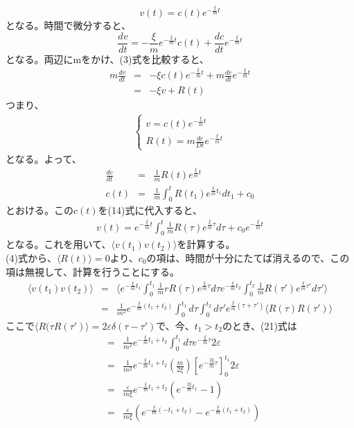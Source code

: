 \documentclass[10pt]{jreport}
\begin{document}
\begin{equation}
v(t) = c(t)e^{-\frac{\xi}{m}t}
\end{equation}
となる。時間で微分すると、
\begin{equation}
\frac{dv}{dt}=-\frac{\xi}{m}e^{-\frac{\xi}{m}t}c(t) + \frac{dc}{dt}e^{-\frac{\xi}{m}t}
\end{equation}
となる。両辺にmをかけ、(3)式を比較すると、
\begin{eqnarray}
m\frac{dv}{dt} &=& -\xi c(t)e^{-\frac{\xi}{m}t}+m\frac{dc}{dt}e^{-\frac{\xi}{m}t} \\
&=& -\xi v +R(t)
\end{eqnarray}
つまり、
\begin{eqnarray}
\left \{
\begin{array}{l}
v = c(t) e^{-\frac{\xi}{m}t} \\
R(t) =m\frac{dc}{Dt}e^{-\frac{\xi}{m}t}
\end{array}
\right.
\end{eqnarray}
となる。よって、
\begin{eqnarray}
\frac{dc}{dt} &=& \frac{1}{m}R(t)e^{\frac{\xi}{m}t} \nonumber \\
c(t) &=& \frac{1}{m}\int^t_0R(t_1)e^{\frac{\xi}{m}t_1}dt_1 +c_0
\end{eqnarray}
とおける。この$c(t)$を(14)式に代入すると、
\begin{eqnarray}
v(t) = e^{-\frac{\xi}{m}t}\int^t_0 \frac{1}{m}R(\tau)e^{\frac{\xi}{m}\tau}d\tau +c_0e^{-\frac{\xi}{m}t}
\end{eqnarray}
となる。これを用いて、$\langle v(t_1)v(t_2) \rangle$を計算する。\\
(4)式から、$\langle R(t)\rangle =0 $より、$c_0$の項は、時間が十分にたてば消えるので、この項は無視して、計算を行うことにする。
\begin{eqnarray}
\langle v(t_1)v(t_2) \rangle &=& \langle e^{-\frac{\xi}{m}t_1}\int^{t_1}_0 \frac{1}{m} rR(\tau)e^{\frac{\xi}{m}\tau}d\tau e^{-\frac{\xi}{m}t_2}\int^{t_2}_0\frac{1}{m}R(\tau ')e^{\frac{\xi}{m}\tau '}d\tau ' \rangle \nonumber \\
&=& \frac{1}{m^2} e^{-\frac{\xi}{m}(t_1+t_2)}\int^{t_1}_0d\tau \int^{t_2}_0d\tau ' e^{\frac{\xi}{m}(\tau+\tau')}\langle R(\tau)R(\tau') \rangle
\end{eqnarray}
ここで$\langle R(\tau R(\tau ') \rangle=2\varepsilon \delta(\tau-\tau ')$で、今、$t_1 > t_2$のとき、(21)式は
\begin{eqnarray}
&=& \frac{1}{m^2}e^{-\frac{\xi}{m}t_1+t_2}\int^{t_1}_0 d\tau e^{-\frac{\xi}{m}\tau}2\varepsilon \nonumber \\
&=& \frac{1}{m^2}e^{-\frac{\xi}{m}t_1+t_2}(\frac{m}{2\xi})[e^{-\frac{2\xi}{m}\tau}]^{t_1}_0 2\varepsilon \nonumber \\
&=& \frac{\varepsilon}{m\xi} e^{-\frac{\xi}{m}t_1+t_2}(e^{-\frac{2\xi}{m}t_1}-1) \nonumber \\
&=& \frac{\varepsilon}{m\xi} (e^{-\frac{\xi}{m}(-t_1+t_2)}-e^{-\frac{\xi}{m}(t_1+t_2)})
\end{eqnarray}
\end{document}
